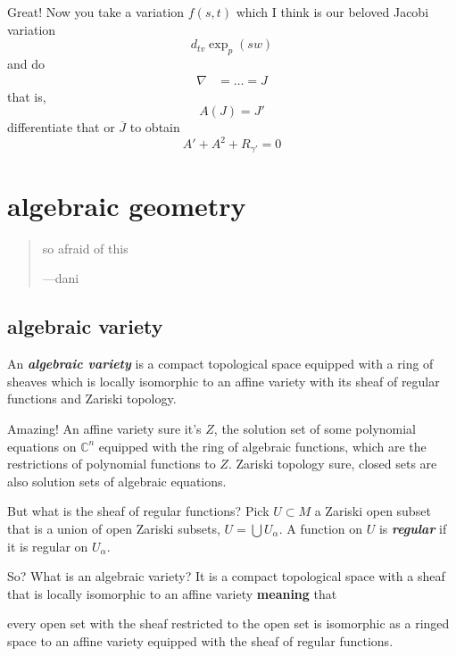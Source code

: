 Great! Now you take a variation \(f(s,t)\) which I think is our beloved Jacobi variation
\[d_{tv}\operatorname{exp}_p(sw)\]
and do
\begin{align*}
\nabla &= \ldots=J
\end{align*}
that is,
\[A(J)=J'\]
differentiate that or \(\overline{J}\) to obtain
\[A'+A^2+R_{\gamma'}=0\]





\section{algebraic geometry}
\vspace{1em}
\begin{quotation}
so afraid of this

\hfill ---dani
\end{quotation}
\vspace{2em}
\subsection{algebraic variety}

An \textit{\textbf{algebraic variety}} is a compact topological space equipped with a ring of sheaves which is locally isomorphic to an affine variety with its sheaf of regular functions and Zariski topology.

Amazing! An affine variety sure it's \(Z\), the solution set of some polynomial equations on \(\mathbb{C}^n\) equipped with the ring of algebraic functions, which are the restrictions of polynomial functions to \(Z\). Zariski topology sure, closed sets are also solution sets of algebraic equations.

But what is the sheaf of regular functions? Pick \(U \subset M\) a Zariski open subset that is a union of open Zariski subsets, \(U=\bigcup U_\alpha\). A function on \(U\) is \textit{\textbf{regular}} if it is regular on \(U_\alpha\).

So? What is an algebraic variety? It is a compact topological space with a sheaf that is locally isomorphic to an affine variety \textbf{meaning} that 

\begin{tcolorbox}[colback=white,colframe=black,boxrule=0.5pt,sharp corners]
every open set with the sheaf restricted to the open set is isomorphic as a ringed space to an affine variety equipped with the sheaf of regular functions.
\end{tcolorbox}

